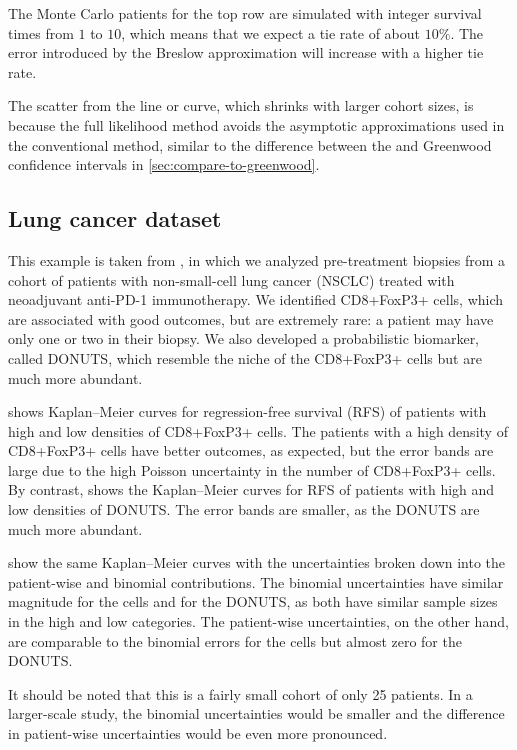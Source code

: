 \documentclass[article]{jss}
\newcommand{\KM}{Kaplan--Meier} %
\begin{document}
The Monte Carlo patients for the top row are simulated with integer survival times from \(1\) to \(10\), which means that we expect a tie rate of about \(10\%\).  The error introduced by the Breslow approximation will increase with a higher tie rate.

The scatter from the line or curve, which shrinks with larger cohort sizes, is because the full likelihood method avoids the asymptotic approximations used in the conventional method, similar to the difference between the  and Greenwood confidence intervals in \cref{sec:compare-to-greenwood}.

\subsection{Lung cancer dataset}

This example is taken from \citet{DONUTS}, in which we analyzed pre-treatment biopsies from a cohort of patients with non-small-cell lung cancer (NSCLC) treated with neoadjuvant anti-PD-1 immunotherapy.  We identified CD8+FoxP3+ cells, which are associated with good outcomes, but are extremely rare: a patient may have only one or two in their biopsy.  We also developed a probabilistic biomarker, called DONUTS, which resemble the niche of the CD8+FoxP3+ cells but are much more abundant.

 shows \KM{} curves for regression-free survival (RFS) of patients with high and low densities of CD8+FoxP3+ cells.  The patients with a high density of CD8+FoxP3+ cells have better outcomes, as expected, but the error bands are large due to the high Poisson uncertainty in the number of CD8+FoxP3+ cells.  By contrast,  shows the \KM{} curves for RFS of patients with high and low densities of DONUTS\@.  The error bands are smaller, as the DONUTS are much more abundant.

 show the same \KM{} curves with the uncertainties broken down into the patient-wise and binomial contributions.  The binomial uncertainties have similar magnitude for the cells and for the DONUTS, as both have similar sample sizes in the high and low categories.  The patient-wise uncertainties, on the other hand, are comparable to the binomial errors for the cells but almost zero for the DONUTS\@.

It should be noted that this is a fairly small cohort of only 25 patients.  In a larger-scale study, the binomial uncertainties would be smaller and the difference in patient-wise uncertainties would be even more pronounced.
\end{document}
